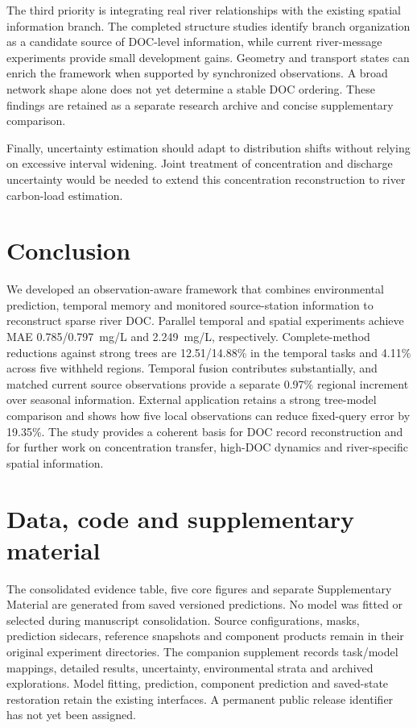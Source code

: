 \documentclass[11pt]{article}
\begin{document}
The third priority is integrating real river relationships with the existing spatial information branch. The completed structure studies identify branch organization as a candidate source of DOC-level information, while current river-message experiments provide small development gains. Geometry and transport states can enrich the framework when supported by synchronized observations. A broad network shape alone does not yet determine a stable DOC ordering. These findings are retained as a separate research archive and concise supplementary comparison.

Finally, uncertainty estimation should adapt to distribution shifts without relying on excessive interval widening. Joint treatment of concentration and discharge uncertainty would be needed to extend this concentration reconstruction to river carbon-load estimation.

\section{Conclusion}
We developed an observation-aware framework that combines environmental prediction, temporal memory and monitored source-station information to reconstruct sparse river DOC. Parallel temporal and spatial experiments achieve MAE 0.785/0.797~mg/L and 2.249~mg/L, respectively. Complete-method reductions against strong trees are 12.51/14.88\% in the temporal tasks and 4.11\% across five withheld regions. Temporal fusion contributes substantially, and matched current source observations provide a separate 0.97\% regional increment over seasonal information. External application retains a strong tree-model comparison and shows how five local observations can reduce fixed-query error by 19.35\%. The study provides a coherent basis for DOC record reconstruction and for further work on concentration transfer, high-DOC dynamics and river-specific spatial information.

\section*{Data, code and supplementary material}
The consolidated evidence table, five core figures and separate Supplementary Material are generated from saved versioned predictions. No model was fitted or selected during manuscript consolidation. Source configurations, masks, prediction sidecars, reference snapshots and component products remain in their original experiment directories. The companion supplement records task/model mappings, detailed results, uncertainty, environmental strata and archived explorations. Model fitting, prediction, component prediction and saved-state restoration retain the existing interfaces. A permanent public release identifier has not yet been assigned.
\end{document}
